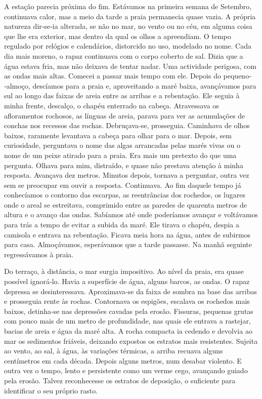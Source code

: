 A estação parecia próxima do fim. Estávamos na primeira semana de
Setembro, continuava calor, mas a meio da tarde a praia permanecia quase
vazia. A própria natureza dir­‑se­‑ia alterada, se não no mar, no vento
ou no céu, em alguma coisa que lhe era exterior, mas dentro da qual os
olhos a apreendiam. O tempo regulado por relógios e calendários,
distorcido no uso, modelado no nome. Cada dia mais moreno, o rapaz
continuava com o corpo coberto de sal. Dizia que a água estava fria, mas
não deixava de tentar nadar. Uma actividade perigosa, com as ondas mais
altas. Comecei a passar mais tempo com ele. Depois do pequeno­‑almoço,
descíamos para a praia e, aproveitando a maré baixa, avançávamos para
sul ao longo das faixas de areia entre as arribas e a rebentação. Ele
seguia à minha frente, descalço, o chapéu enterrado na cabeça.
Atravessava os afloramentos rochosos, as línguas de areia, parava para
ver as acumulações de conchas nos recessos das rochas. Debruçava­‑se,
prosseguia. Caminhava de olhos baixos, raramente levantava a cabeça para
olhar para o mar. Depois, sem curiosidade, perguntava o nome das algas
arrancadas pelas marés vivas ou o nome de um peixe atirado para a praia.
Era mais um pretexto do que uma pergunta. Olhava para mim, distraído, e
quase não prestava atenção à minha resposta. Avançava dez metros.
Minutos depois, tornava a perguntar, outra vez sem se preocupar em ouvir
a resposta. Continuava. Ao fim daquele tempo já conhecíamos o contorno
das escarpas, as reentrâncias dos rochedos, os lugares onde o areal se
estreitava, comprimido entre as paredes de quarenta metros de altura e o
avanço das ondas. Sabíamos até onde poderíamos avançar e voltávamos para
trás a tempo de evitar a subida da maré. Ele tirava o chapéu, despia a
camisola e entrava na rebentação. Ficava meia hora na água, antes de
subirmos para casa. Almoçávamos, esperávamos que a tarde passasse. Na
manhã seguinte regressávamos à praia.

Do terraço, à distância, o mar surgia impositivo. Ao nível da praia, era
quase possível ignorá­‑lo. Havia a superfície de água, alguns barcos, as
ondas. O rapaz depressa se desinteressava. Aproximava­‑se da faixa de
sombra na base das arribas e prosseguia rente às rochas. Contornava os
espigões, escalava os rochedos mais baixos, detinha­‑se nas depressões
cavadas pela erosão. Fissuras, pequenas grutas com pouco mais de um
metro de profundidade, nas quais ele entrava a rastejar, bacias de areia
e água da maré alta. A rocha compacta ia cedendo e devolvia ao mar os
sedimentos friáveis, deixando expostos os estratos mais resistentes.
Sujeita ao vento, ao sal, à água, às variações térmicas, a arriba
recuava alguns centímetros em cada década. Depois alguns metros, num
desabar violento. E outra vez o tempo, lento e persistente como um verme
cego, avançando guiado pela erosão. Talvez reconhecesse os estratos de
deposição, o suficiente para identificar o seu próprio rasto.

